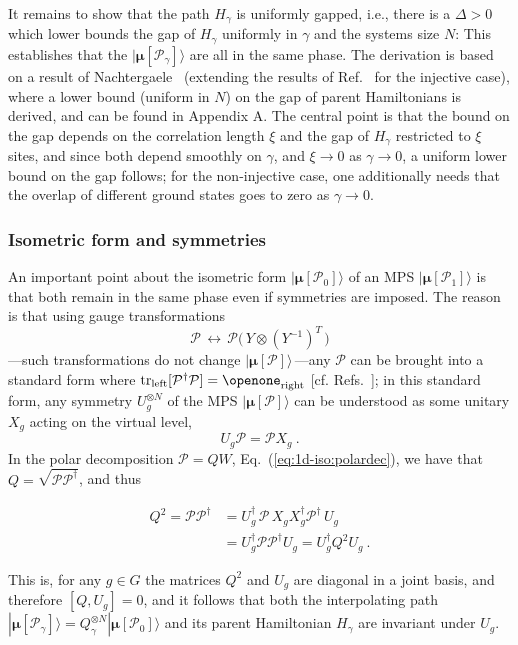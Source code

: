 \documentclass[twocolumn,superscriptaddress,prb,linenumbers]{revtex4-1}
\newcommand{\MPS}[1]{| {\bm\mu}[#1]\rangle}
\newcommand{\mc}[1]{\mathcal{#1}}
\newcommand{\tr}{\mathrm{tr}}
\newcommand{\sss}[1]{\subsubsection{#1}}
\begin{document}
It remains to show that the path $H_\gamma$ is uniformly gapped, i.e.,
there is a $\Delta>0$ which lower bounds the gap of $H_\gamma$ uniformly
in $\gamma$ and the systems size $N$: This establishes that the $\MPS{\mc
        P_\gamma}$ are all in the same phase. The derivation is based on a result of
Nachtergaele~\cite{nachtergaele:degen-mps} (extending the results
of Ref.~ for the injective case), where a lower bound (uniform
in $N$) on the gap of parent Hamiltonians is derived, and can be found in
Appendix A. The central point is that the bound on the gap depends on the
correlation length $\xi$ and the gap of $H_\gamma$ restricted to $\xi$
sites, and since both depend smoothly on $\gamma$, and $\xi\rightarrow 0$
as $\gamma\rightarrow 0$,  a uniform lower bound on the gap follows; for
the non-injective case, one additionally needs that the overlap of
different ground states goes to zero as $\gamma\rightarrow 0$.

\sss{Isometric form and symmetries}%
An important point about the isometric form $\MPS{\mc P_0} $ of an MPS
$\MPS{\mc P_1}$ is that both remain in the same phase even if symmetries
are imposed. The reason is that using gauge transformations
\[
    \mc P\,\longleftrightarrow\,\mc P\big(\,Y\otimes (Y^{-1})^T\,\big)
\]
---such transformations do not change $\MPS{\mc
        P}$\,---any $\mc P$ can be brought into a standard form where
$\tr_\mathrm{left}[\mc P^\dagger \mc P]=\openone_{\mathrm{right}}$
[cf. Refs.~];
in this standard form, any symmetry $U_g^{\otimes N}$ of the MPS $\MPS{\mc
        P}$ can be understood as some unitary $X_g$ acting on the virtual
level,~\cite{david:stringorder-1d}
\[
    U_g \mc P = \mc P X_g\ .
\]
In the polar decomposition $\mc P=QW$, Eq.~(\ref{eq:1d-iso:polardec}),
we have that $Q=\sqrt{\mc P \mc P^\dagger}$, and thus
\begin{linenomath}
    \begin{align*}
        Q^2=\mc P \mc P^\dagger & =
        U_g^\dagger\, \mc P \, X_g
        X_g^\dagger \mc P^\dagger \, U_g
        \\
                                & = U_g^\dagger \mc P \mc P^\dagger U_g
        = U_g^\dagger Q^2 U_g\ .
    \end{align*}
\end{linenomath}
This is, for any $g\in G$ the matrices $Q^2$ and $U_g$ are diagonal in a
joint basis, and therefore $[Q,U_g]=0$, and it follows that both the
interpolating path $\MPS{\mc P_\gamma}=Q_\gamma^{\otimes N}\MPS{\mc P_0}$
and its parent Hamiltonian $H_\gamma$ are invariant under $U_g$.
\end{document}
